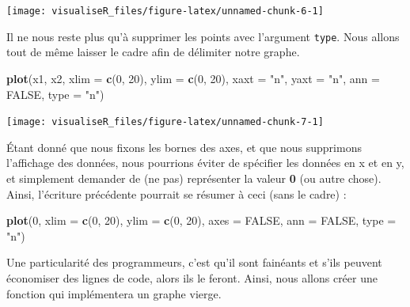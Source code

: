 \documentclass[]{article}
\newenvironment{Shaded}{\begin{snugshade}}{\end{snugshade}}
\newcommand{\DataTypeTok}[1]{\textcolor[rgb]{0.13,0.29,0.53}{#1}}
\newcommand{\DecValTok}[1]{\textcolor[rgb]{0.00,0.00,0.81}{#1}}
\newcommand{\KeywordTok}[1]{\textcolor[rgb]{0.13,0.29,0.53}{\textbf{#1}}}
\newcommand{\NormalTok}[1]{#1}
\newcommand{\OtherTok}[1]{\textcolor[rgb]{0.56,0.35,0.01}{#1}}
\newcommand{\StringTok}[1]{\textcolor[rgb]{0.31,0.60,0.02}{#1}}
\begin{document}
\begin{center}\texttt{[image: visualiseR\_files/figure-latex/unnamed-chunk-6-1]} \end{center}

Il ne nous reste plus qu'à supprimer les points avec l'argument \texttt{type}. Nous allons tout de même laisser le cadre afin de délimiter notre graphe.

\begin{Shaded}
\begin{Highlighting}[]
\KeywordTok{plot}\NormalTok{(x1, x2, }\DataTypeTok{xlim =} \KeywordTok{c}\NormalTok{(}\DecValTok{0}\NormalTok{, }\DecValTok{20}\NormalTok{), }\DataTypeTok{ylim =} \KeywordTok{c}\NormalTok{(}\DecValTok{0}\NormalTok{, }\DecValTok{20}\NormalTok{), }\DataTypeTok{xaxt =} \StringTok{"n"}\NormalTok{, }\DataTypeTok{yaxt =} \StringTok{"n"}\NormalTok{, }\DataTypeTok{ann =} \OtherTok{FALSE}\NormalTok{, }\DataTypeTok{type =} \StringTok{"n"}\NormalTok{)}
\end{Highlighting}
\end{Shaded}

\begin{center}\texttt{[image: visualiseR\_files/figure-latex/unnamed-chunk-7-1]} \end{center}

Étant donné que nous fixons les bornes des axes, et que nous supprimons l'affichage des données, nous pourrions éviter de spécifier les données en x et en y, et simplement demander de (ne pas) représenter la valeur \textbf{0} (ou autre chose). Ainsi, l'écriture précédente pourrait se résumer à ceci (sans le cadre) :

\begin{Shaded}
\begin{Highlighting}[]
\KeywordTok{plot}\NormalTok{(}\DecValTok{0}\NormalTok{, }\DataTypeTok{xlim =} \KeywordTok{c}\NormalTok{(}\DecValTok{0}\NormalTok{, }\DecValTok{20}\NormalTok{), }\DataTypeTok{ylim =} \KeywordTok{c}\NormalTok{(}\DecValTok{0}\NormalTok{, }\DecValTok{20}\NormalTok{), }\DataTypeTok{axes =} \OtherTok{FALSE}\NormalTok{, }\DataTypeTok{ann =} \OtherTok{FALSE}\NormalTok{, }\DataTypeTok{type =} \StringTok{"n"}\NormalTok{)}
\end{Highlighting}
\end{Shaded}

Une particularité des programmeurs, c'est qu'il sont fainéants et s'ils peuvent économiser des lignes de code, alors ils le feront. Ainsi, nous allons créer une fonction qui implémentera un graphe vierge.
\end{document}
